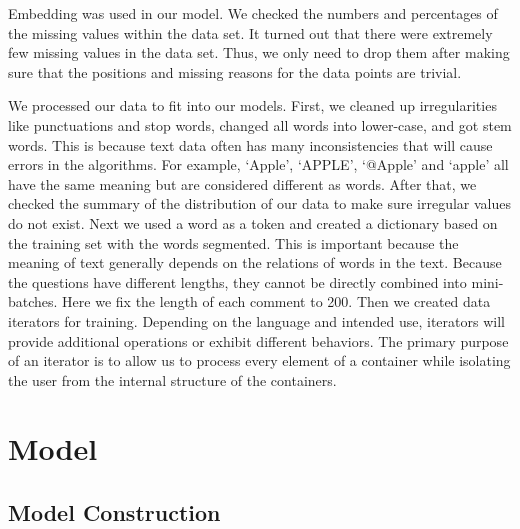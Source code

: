 \documentclass{article}
\begin{document}
Embedding was used in our model. We checked the numbers and percentages of the missing values within the data set. It turned out that there were extremely few missing values in the data set. Thus, we only need to drop them after making sure that the positions and missing reasons for the data points are trivial. 

We processed our data to fit into our models. First, we cleaned up irregularities like punctuations and stop words, changed all words into lower-case, and got stem words. This is because text data often has many inconsistencies that will cause errors in the algorithms. For example, ‘Apple’, ‘APPLE’, ‘@Apple’ and ‘apple’ all have the same meaning but are considered different as words. After that, we checked the summary of the distribution of our data to make sure irregular values do not exist. Next we used a word as a token and created a dictionary based on the training set with the words segmented. This is important because the meaning of text generally depends on the relations of words in the text. Because the questions have different lengths, they cannot be directly combined into mini-batches. Here we fix the length of each comment to 200. Then we created data iterators for training. Depending on the language and intended use, iterators will provide additional operations or exhibit different behaviors. The primary purpose of an iterator is to allow us to process every element of a container while isolating the user from the internal structure of the containers.

\section{Model}
\subsection{Model Construction}
\end{document}

